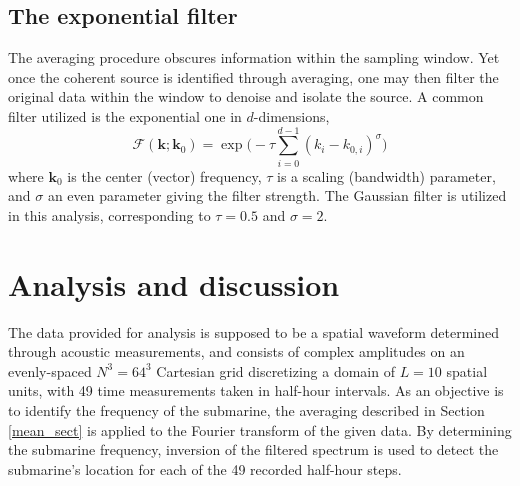 \documentclass{article}
\begin{document}
\subsection{The exponential filter}
The averaging procedure obscures information within the sampling window. Yet once the coherent source is identified through averaging, one may then filter the original data within the window to denoise and isolate the source. A common filter utilized is the exponential one in $d$-dimensions,
\begin{equation}
  \mathcal{F}(\bm{k};\bm{k}_0) = \exp\Big(-\tau\sum_{i=0}^{d-1}(k_i - k_{0,i})^{\sigma}\Big)\label{filter}
\end{equation}
where $\bm{k}_0$ is the center (vector) frequency, $\tau$ is a scaling (bandwidth) parameter, and $\sigma$ an even parameter giving the filter strength. The Gaussian filter is utilized in this analysis, corresponding to $\tau = 0.5$ and $\sigma = 2$.

\section{Analysis and discussion}
The data provided for analysis is supposed to be a spatial waveform determined through acoustic measurements, and consists of complex amplitudes on an evenly-spaced $N^3 = 64^3$ Cartesian grid discretizing a domain of $L = 10$ spatial units, with 49 time measurements taken in half-hour intervals. As an objective is to identify the frequency of the submarine, the averaging described in Section \ref{mean_sect} is applied to the Fourier transform of the given data. By determining the submarine frequency, inversion of the filtered spectrum is used to detect the submarine's location for each of the 49 recorded half-hour steps.
\end{document}
